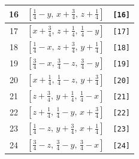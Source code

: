 \documentclass[fleqn,8pt]{jsarticle}
\begin{document}
\begin{longtable}{ccc}
16 & $\left[ \frac{1}{4} - y,\, x + \frac{3}{4},\, z + \frac{1}{4} \right]$ & {\tt [16]} \\ \hline
17 & $\left[ x + \frac{3}{4},\, z + \frac{1}{4},\, \frac{1}{4} - y \right]$ & {\tt [17]} \\ \hline
18 & $\left[ \frac{1}{4} - x,\, z + \frac{3}{4},\, y + \frac{1}{4} \right]$ & {\tt [18]} \\ \hline
19 & $\left[ \frac{3}{4} - x,\, \frac{3}{4} - z,\, \frac{3}{4} - y \right]$ & {\tt [19]} \\ \hline
20 & $\left[ x + \frac{1}{4},\, \frac{1}{4} - z,\, y + \frac{3}{4} \right]$ & {\tt [20]} \\ \hline
21 & $\left[ z + \frac{3}{4},\, y + \frac{1}{4},\, \frac{1}{4} - x \right]$ & {\tt [21]} \\ \hline
22 & $\left[ z + \frac{1}{4},\, \frac{1}{4} - y,\, x + \frac{3}{4} \right]$ & {\tt [22]} \\ \hline
23 & $\left[ \frac{1}{4} - z,\, y + \frac{3}{4},\, x + \frac{1}{4} \right]$ & {\tt [23]} \\ \hline
24 & $\left[ \frac{3}{4} - z,\, \frac{3}{4} - y,\, \frac{3}{4} - x \right]$ & {\tt [24]} \\
\end{longtable}
\end{document}
